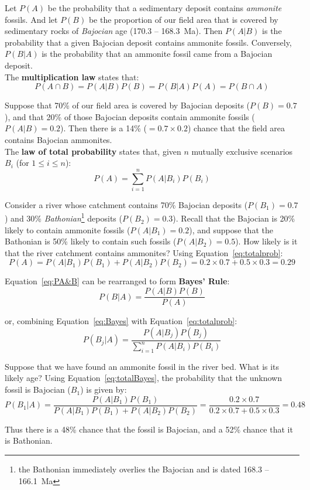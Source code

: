 Let $P(A)$ be the probability that a sedimentary deposit contains
\emph{ammonite} fossils.  And let $P(B)$ be the proportion of our
field area that is covered by sedimentary rocks of \emph{Bajocian} age
(170.3 -- 168.3~Ma). Then $P(A|B)$ is the probability that a given
Bajocian deposit contains ammonite fossils. Conversely, $P(B|A)$ is
the probability that an ammonite fossil came from a Bajocian
deposit.\\

The \textbf{multiplication law} states that:
\begin{equation}
  P({A}\cap{B}) = P(A|B) P(B) = P(B|A) P(A) = P({B}\cap{A})
  \label{eq:PA&B}
\end{equation}

Suppose that 70\% of our field area is covered by Bajocian deposits
($P(B)=0.7$), and that 20\% of those Bajocian deposits contain
ammonite fossils ($P(A|B)=0.2$). Then there is a 14\%
($=0.7\times{0.2}$) chance that the field area contains Bajocian
ammonites.\\

The \textbf{law of total probability} states that, given $n$ mutually
exclusive scenarios $B_i$ (for $1\leq{i}\leq{n}$):
\begin{equation}
  P(A) = \sum\limits_{i=1}^{n} P(A|B_i) P(B_i)
  \label{eq:totalprob}
\end{equation}

Consider a river whose catchment contains 70\% Bajocian deposits
($P(B_1)=0.7$) and 30\% \emph{Bathonian}\footnote{the Bathonian
  immediately overlies the Bajocian and is dated 168.3 -- 166.1~Ma}
deposits ($P(B_2)=0.3$). Recall that the Bajocian is 20\% likely to
contain ammonite fossils ($P(A|B_1)=0.2$), and suppose that the
Bathonian is 50\% likely to contain such fossils ($P(A|B_2)=0.5$).
How likely is it that the river catchment contains ammonites? Using
Equation~\ref{eq:totalprob}:
\[
P(A) = P(A|B_1) P(B_1) + P(A|B_2) P(B_2) =
0.2 \times 0.7 + 0.5 \times 0.3 = 0.29
\]

Equation~\ref{eq:PA&B} can be rearranged to form \textbf{Bayes' Rule}:
\begin{equation}
  P(B|A) = \frac{P(A|B) P(B)}{P(A)}
  \label{eq:Bayes}
\end{equation}

\noindent or, combining Equation~\ref{eq:Bayes} with
Equation~\ref{eq:totalprob}:
\begin{equation}
  P(B_j|A) = \frac{P(A|B_j) P(B_j)}{\sum\limits_{i=1}^{n}P(A|B_i) P(B_i)}
  \label{eq:totalBayes}
\end{equation}

Suppose that we have found an ammonite fossil in the river bed.  What
is its likely age? Using Equation~\ref{eq:totalBayes}, the probability
that the unknown fossil is Bajocian ($B_1$) is given by:
\[
  P(B_1|A) = \frac{P(A|B_1) P(B_1)}{P(A|B_1) P(B_1) + P(A|B_2) P(B_2)} = 
   \frac{0.2 \times 0.7}{0.2 \times 0.7 + 0.5 \times 0.3} = 0.48
\]

Thus there is a 48\% chance that the fossil is Bajocian, and a 52\%
chance that it is Bathonian.
